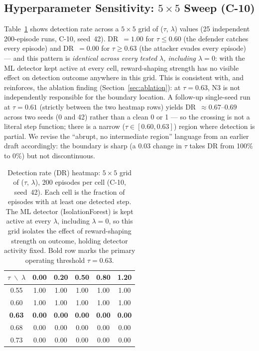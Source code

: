 \documentclass[sigconf]{acmart}
\begin{document}
\subsection{Hyperparameter Sensitivity: $5\!\times\!5$ Sweep (C-10)}
\label{sec:heatmap}

Table~\ref{tab:heatmap} shows detection rate across a $5\!\times\!5$ grid
of ($\tau$, $\lambda$) values (25 independent 200-episode runs, C-10,
seed~42). DR~$= 1.00$ for $\tau \leq 0.60$ (the defender catches every
episode) and DR~$= 0.00$ for $\tau \geq 0.63$ (the attacker evades every
episode) --- and this pattern is \emph{identical across every tested
$\lambda$, including $\lambda=0$}: with the ML detector kept active at
every cell, reward-shaping strength has no
visible effect on detection outcome anywhere in this grid. This is
consistent with, and reinforces, the ablation finding
(Section~\ref{sec:ablation}): at $\tau=0.63$, N3 is not independently
responsible for the boundary location. A follow-up single-seed run at
$\tau=0.61$ (strictly between the two heatmap rows) yields
DR~$\approx 0.67$--$0.69$ across two seeds (0 and 42) rather than a
clean 0 or 1 --- so the crossing is not a literal step function; there
is a narrow ($\tau \in [0.60, 0.63]$) region where detection is
partial. We revise the ``abrupt, no intermediate region'' language
from an earlier draft accordingly: the boundary is sharp (a 0.03 change
in $\tau$ takes DR from 100\% to 0\%) but not discontinuous.

\begin{table}[t]
\caption{Detection rate (DR) heatmap: $5\!\times\!5$ grid of ($\tau$, $\lambda$),
200 episodes per cell (C-10, seed~42). Each cell is the fraction of episodes with
at least one detected step. The ML detector (IsolationForest) is kept
active at every $\lambda$, including $\lambda=0$, so this grid isolates
the effect of reward-shaping strength on outcome, holding detector
activity fixed. Bold row marks the primary operating threshold
$\tau = 0.63$.}
\label{tab:heatmap}
\centering
\begin{tabular}{c | c c c c c}
\toprule
$\tau \;\backslash\; \lambda$ & 0.00 & 0.20 & 0.50 & 0.80 & 1.20 \\
\midrule
0.55 & 1.00 & 1.00 & 1.00 & 1.00 & 1.00 \\
0.60 & 1.00 & 1.00 & 1.00 & 1.00 & 1.00 \\
\textbf{0.63} & \textbf{0.00} & \textbf{0.00} & \textbf{0.00} & \textbf{0.00} & \textbf{0.00} \\
0.68 & 0.00 & 0.00 & 0.00 & 0.00 & 0.00 \\
0.73 & 0.00 & 0.00 & 0.00 & 0.00 & 0.00 \\
\bottomrule
\end{tabular}
\end{table}
\end{document}

